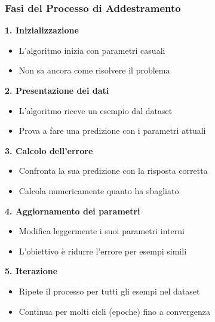 \documentclass[aspectratio=169]{beamer}
\begin{document}
\begin{frame}
\frametitle{Fasi del Processo di Addestramento}
\textbf{1. Inizializzazione}
\begin{itemize}
\item L'algoritmo inizia con parametri casuali
\item Non sa ancora come risolvere il problema
\end{itemize}

\textbf{2. Presentazione dei dati}
\begin{itemize}
\item L'algoritmo riceve un esempio dal dataset
\item Prova a fare una predizione con i parametri attuali
\end{itemize}

\textbf{3. Calcolo dell'errore}
\begin{itemize}
\item Confronta la sua predizione con la risposta corretta
\item Calcola numericamente quanto ha sbagliato
\end{itemize}

\textbf{4. Aggiornamento dei parametri}
\begin{itemize}
\item Modifica leggermente i suoi parametri interni
\item L'obiettivo è ridurre l'errore per esempi simili
\end{itemize}

\textbf{5. Iterazione}
\begin{itemize}
\item Ripete il processo per tutti gli esempi nel dataset
\item Continua per molti cicli (epoche) fino a convergenza
\end{itemize}
\end{frame}
%
%
\end{document}
